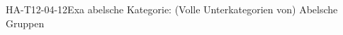 
\begin{EXA}{HA-T12-04-12}{Exa abelsche Kategorie: (Volle Unterkategorien von) Abelsche Gruppen}
\end{EXA}
